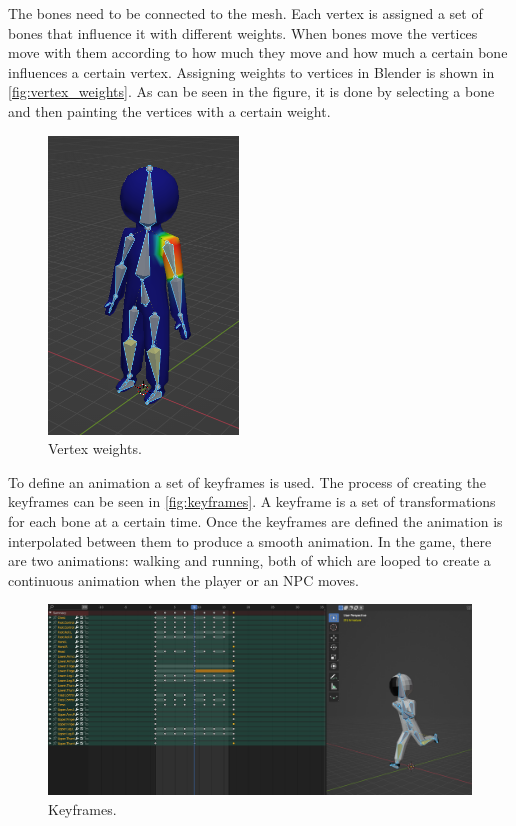 The bones need to be connected to the mesh.
Each vertex is assigned a set of bones that influence it with different weights.
When bones move the vertices move with them according to how much they move and how much a certain bone influences a certain vertex.
Assigning weights to vertices in Blender is shown in \autoref{fig:vertex_weights}.
As can be seen in the figure, it is done by selecting a bone and then painting the vertices with a certain weight.

\begin{figure}[H]
    \centering
    \includegraphics[width=0.45\textwidth]{chapters/theoretical_foundations/sections/models/resources/WeightPaint.png}
    \caption{Vertex weights.}
    \label{fig:vertex_weights}
\end{figure}

To define an animation a set of keyframes is used.
The process of creating the keyframes can be seen in \autoref{fig:keyframes}.
A keyframe is a set of transformations for each bone at a certain time.
Once the keyframes are defined the animation is interpolated between them to produce a smooth animation.
In the game, there are two animations: walking and running, both of which are looped to create a continuous animation when the player or an NPC moves.

\begin{figure}[H]
    \centering
    \includegraphics[width=1\textwidth]{chapters/theoretical_foundations/sections/models/resources/DopeSheet.png}
    \caption{Keyframes.}
    \label{fig:keyframes}
\end{figure}


